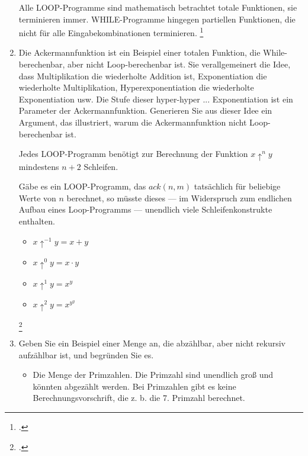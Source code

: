 \documentclass{bschlangaul-aufgabe}
\begin{document}
\begin{enumerate}
\begin{bAntwort}
Alle LOOP-Programme sind mathematisch betrachtet totale Funktionen,
\dh sie terminieren immer. WHILE-Programme hingegen partiellen
Funktionen, die nicht für alle Eingabekombinationen terminieren.
\footcite[Seite 258-259]{hoffmann}
\end{bAntwort}



\item Die Ackermannfunktion ist ein Beispiel einer totalen Funktion, die
While-berechenbar, aber nicht Loop-berechenbar ist. Sie verallgemeinert
die Idee, dass Multiplikation die wiederholte Addition ist,
Exponentiation die wiederholte Multiplikation, Hyperexponentiation die
wiederholte Exponentiation usw. Die Stufe dieser hyper-hyper ...
Exponentiation ist ein Parameter der Ackermannfunktion. Generieren Sie
aus dieser Idee ein Argument, das illustriert, warum die
Ackermannfunktion nicht Loop-berechenbar ist.

\begin{bAntwort}
Jedes LOOP-Programm benötigt zur Berechnung der Funktion $x \uparrow^n
y$ mindestens $n + 2$ Schleifen.

Gäbe es ein LOOP-Programm, das $ack(n,
m)$ tatsächlich für beliebige Werte von $n$ berechnet, so müsste dieses
--- im Widerspruch zum endlichen Aufbau eines Loop-Programms ---
unendlich viele Schleifenkonstrukte enthalten.


\begin{itemize}
\item $x \uparrow^{-1} y = x + y$
\item $x \uparrow^0 y = x \cdot y$
\item $x \uparrow^1 y = x^y$
\item $x \uparrow^2 y = x^{y^y}$

\end{itemize}
\footcite[Seite 258]{hoffmann}
\end{bAntwort}



\item Geben Sie ein Beispiel einer Menge an, die abzählbar, aber nicht
rekursiv aufzählbar ist, und begründen Sie es.

\begin{bAntwort}
\begin{itemize}
\item Die Menge der Primzahlen. Die Primzahl sind unendlich groß und
könnten abgezählt werden. Bei Primzahlen gibt es keine
Berechnungsvorschrift, die z. b. die 7. Primzahl berechnet.


\end{itemize}
\end{bAntwort}
\end{enumerate}
\end{document}
